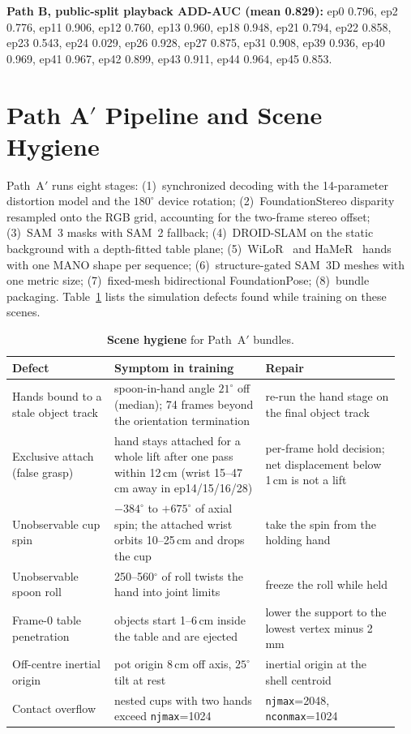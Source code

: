 \documentclass[10pt]{nvidiaextabstract}
\begin{document}
\textbf{Path B, public-split playback ADD-AUC (mean 0.829):} ep0 0.796, ep2 0.776, ep11 0.906, ep12 0.760, ep13 0.960, ep18 0.948, ep21 0.794, ep22 0.858, ep23 0.543, ep24 0.029, ep26 0.928, ep27 0.875, ep31 0.908, ep39 0.936, ep40 0.969, ep41 0.967, ep42 0.899, ep43 0.911, ep44 0.964, ep45 0.853.

\section{Path A$'$ Pipeline and Scene Hygiene}
\label{app:patha-prime}
Path~A$'$ runs eight stages: (1)~synchronized decoding with the 14-parameter distortion model and the $180^\circ$ device rotation; (2)~FoundationStereo disparity resampled onto the RGB grid, accounting for the two-frame stereo offset; (3)~SAM~3 masks with SAM~2 fallback; (4)~DROID-SLAM on the static background with a depth-fitted table plane; (5)~WiLoR~\cite{potamias2025wilor} and HaMeR~\cite{pavlakos2024hamer} hands with one MANO shape per sequence; (6)~structure-gated SAM~3D meshes with one metric size; (7)~fixed-mesh bidirectional FoundationPose; (8)~bundle packaging. Table~\ref{tab:hygiene} lists the simulation defects found while training on these scenes.

\begin{table}[h]
  \centering\footnotesize
  \setlength{\tabcolsep}{4pt}
  \begin{tabular}{@{}p{0.25\linewidth}p{0.37\linewidth}p{0.33\linewidth}@{}}
    \toprule
    \textbf{Defect} & \textbf{Symptom in training} & \textbf{Repair} \\
    \midrule
    Hands bound to a stale object track & spoon-in-hand angle $21^\circ$ off (median); 74 frames beyond the orientation termination & re-run the hand stage on the final object track \\
    Exclusive attach (false grasp) & hand stays attached for a whole lift after one pass within 12\,cm (wrist 15--47\,cm away in ep14/15/16/28) & per-frame hold decision; net displacement below 1\,cm is not a lift \\
    Unobservable cup spin & $-384^\circ$ to $+675^\circ$ of axial spin; the attached wrist orbits 10--25\,cm and drops the cup & take the spin from the holding hand \\
    Unobservable spoon roll & 250--560$^\circ$ of roll twists the hand into joint limits & freeze the roll while held \\
    Frame-0 table penetration & objects start 1--6\,cm inside the table and are ejected & lower the support to the lowest vertex minus 2\,mm \\
    Off-centre inertial origin & pot origin 8\,cm off axis, $25^\circ$ tilt at rest & inertial origin at the shell centroid \\
    Contact overflow & nested cups with two hands exceed \texttt{njmax}=1024 & \texttt{njmax}=2048, \texttt{nconmax}=1024 \\
    \bottomrule
  \end{tabular}
  \caption{\textbf{Scene hygiene} for Path~A$'$ bundles.}
  \label{tab:hygiene}
\end{table}
\end{document}
